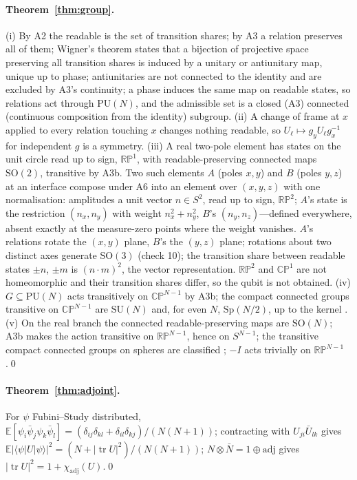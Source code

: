 \documentclass[11pt,a4paper]{article}
\theoremstyle{plain}
\theoremstyle{definition}
\theoremstyle{remark}
\newcommand{\tr}{\operatorname{tr}}
\newcommand{\E}{\mathbb{E}}
\newcommand{\RP}{\mathbb{RP}}
\newcommand{\CP}{\mathbb{CP}}
\newcommand{\SO}{\mathrm{SO}}
\newcommand{\SU}{\mathrm{SU}}
\newcommand{\PU}{\mathrm{PU}}
\newcommand{\Sp}{\mathrm{Sp}}
\newcommand{\adj}{\mathrm{adj}}
\begin{document}
\paragraph{Theorem~\ref{thm:group}.} (i) By A2 the readable is the set of transition shares; by A3 a relation preserves all of them; Wigner's theorem states that a bijection of projective space preserving all transition shares is induced by a unitary or antiunitary map, unique up to phase; antiunitaries are not connected to the identity and are excluded by A3's continuity; a phase induces the same map on readable states, so relations act through $\PU(N)$, and the admissible set is a closed (A3) connected (continuous composition from the identity) subgroup. (ii) A change of frame at $x$ applied to every relation touching $x$ changes nothing readable, so $U_\ell\mapsto g_yU_\ell g_x^{-1}$ for independent $g$ is a symmetry. (iii) A real two-pole element has states on the unit circle read up to sign, $\RP^1$, with readable-preserving connected maps $\SO(2)$, transitive by A3b. Two such elements $A$ (poles $x,y$) and $B$ (poles $y,z$) at an interface compose under A6 into an element over $(x,y,z)$ with one normalisation: amplitudes a unit vector $n\in S^2$, read up to sign, $\RP^2$; $A$'s state is the restriction $(n_x,n_y)$ with weight $n_x^2+n_y^2$, $B$'s $(n_y,n_z)$---defined everywhere, absent exactly at the measure-zero points where the weight vanishes. $A$'s relations rotate the $(x,y)$ plane, $B$'s the $(y,z)$ plane; rotations about two distinct axes generate $\SO(3)$ (check 10); the transition share between readable states $\pm n$, $\pm m$ is $(n\cdot m)^2$, the vector representation. $\RP^2$ and $\CP^1$ are not homeomorphic and their transition shares differ, so the qubit is not obtained. (iv) $G\subseteq\PU(N)$ acts transitively on $\CP^{N-1}$ by A3b; the compact connected groups transitive on $\CP^{N-1}$ are $\SU(N)$ and, for even $N$, $\Sp(N/2)$, up to the kernel \cite{onishchik}. (v) On the real branch the connected readable-preserving maps are $\SO(N)$; A3b makes the action transitive on $\RP^{N-1}$, hence on $S^{N-1}$; the transitive compact connected groups on spheres are classified \cite{ms,borel}; $-I$ acts trivially on $\RP^{N-1}$.\qed

\paragraph{Theorem~\ref{thm:adjoint}.} For $\psi$ Fubini--Study distributed, $\E[\psi_i\bar\psi_j\psi_k\bar\psi_l]=(\delta_{ij}\delta_{kl}+\delta_{il}\delta_{kj})/(N(N+1))$; contracting with $U_{ji}\bar U_{lk}$ gives $\E|\langle\psi|U|\psi\rangle|^2=(N+|\tr U|^2)/(N(N+1))$; $N\otimes\bar N=1\oplus\adj$ gives $|\tr U|^2=1+\chi_{\adj}(U)$.\qed
\end{document}
